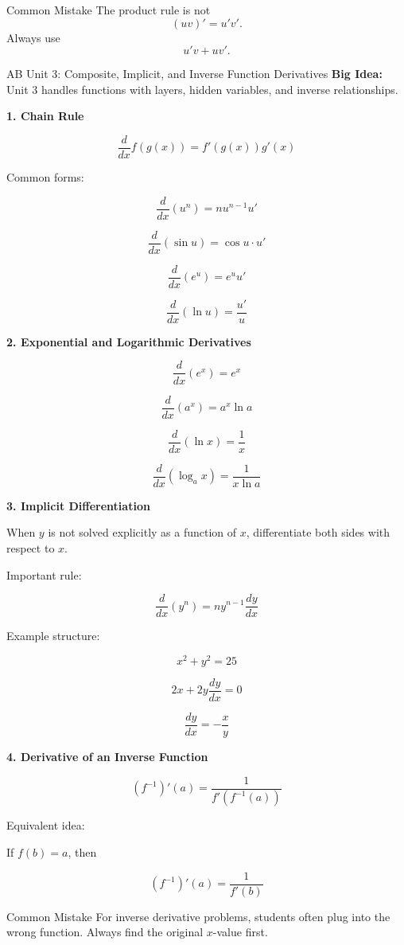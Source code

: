 \documentclass[11pt]{article}
\newcommand{\subtopic}[1]{
\vspace{0.45em}
\textcolor{novelPurpleDark}{\textbf{#1}}
}
\begin{document}
\begin{warningbox}{Common Mistake}
The product rule is not
\[
(uv)'=u'v'.
\]
Always use
\[
u'v+uv'.
\]
\end{warningbox}

\newpage

\begin{unitbox}{AB Unit 3: Composite, Implicit, and Inverse Function Derivatives}
\textbf{Big Idea:} Unit 3 handles functions with layers, hidden variables, and inverse relationships.
\end{unitbox}

\subtopic{1. Chain Rule}

\[
\frac{d}{dx}f(g(x))=f'(g(x))g'(x)
\]

Common forms:

\[
\frac{d}{dx}(u^n)=nu^{n-1}u'
\]

\[
\frac{d}{dx}(\sin u)=\cos u\cdot u'
\]

\[
\frac{d}{dx}(e^u)=e^u u'
\]

\[
\frac{d}{dx}(\ln u)=\frac{u'}{u}
\]

\subtopic{2. Exponential and Logarithmic Derivatives}

\[
\frac{d}{dx}(e^x)=e^x
\]

\[
\frac{d}{dx}(a^x)=a^x\ln a
\]

\[
\frac{d}{dx}(\ln x)=\frac1x
\]

\[
\frac{d}{dx}(\log_a x)=\frac1{x\ln a}
\]

\subtopic{3. Implicit Differentiation}

When \(y\) is not solved explicitly as a function of \(x\), differentiate both sides with respect to \(x\).

Important rule:

\[
\frac{d}{dx}(y^n)=ny^{n-1}\frac{dy}{dx}
\]

Example structure:

\[
x^2+y^2=25
\]

\[
2x+2y\frac{dy}{dx}=0
\]

\[
\frac{dy}{dx}=-\frac{x}{y}
\]

\subtopic{4. Derivative of an Inverse Function}

\[
(f^{-1})'(a)=\frac{1}{f'(f^{-1}(a))}
\]

Equivalent idea:

If \(f(b)=a\), then

\[
(f^{-1})'(a)=\frac{1}{f'(b)}
\]

\begin{warningbox}{Common Mistake}
For inverse derivative problems, students often plug into the wrong function.  
Always find the original \(x\)-value first.
\end{warningbox}
\end{document}
